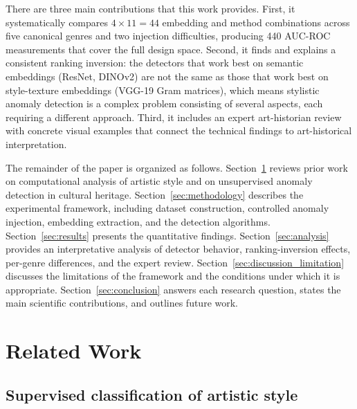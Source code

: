 \documentclass[conference]{IEEEtran}
\begin{document}
There are three main contributions that this work provides. First, it systematically compares $4 \times 11 = 44$ embedding and method combinations across five canonical genres and two injection difficulties, producing 440 AUC-ROC measurements that cover the full design space. Second, it finds and explains a consistent ranking inversion: the detectors that work best on semantic embeddings (ResNet, DINOv2) are not the same as those that work best on style-texture embeddings (VGG-19 Gram matrices), which means stylistic anomaly detection is a complex problem consisting of several aspects, each requiring a different approach. Third, it includes an expert art-historian review with concrete visual examples that connect the technical findings to art-historical interpretation.

The remainder of the paper is organized as follows. Section~\ref{sec:related_work} reviews prior work on computational analysis of artistic style and on unsupervised anomaly detection in cultural heritage. Section~\ref{sec:methodology} describes the experimental framework, including dataset construction, controlled anomaly injection, embedding extraction, and the detection algorithms. Section~\ref{sec:results} presents the quantitative findings. Section~\ref{sec:analysis} provides an interpretative analysis of detector behavior, ranking-inversion effects, per-genre differences, and the expert review. Section~\ref{sec:discussion_limitation} discusses the limitations of the framework and the conditions under which it is appropriate. Section~\ref{sec:conclusion} answers each research question, states the main scientific contributions, and outlines future work.

\section{Related Work}
\label{sec:related_work}

\subsection{Supervised classification of artistic style}
\end{document}
